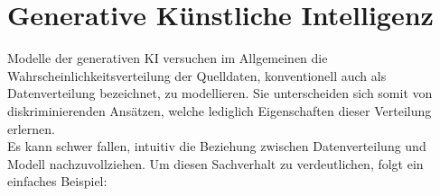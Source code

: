 
\section{Generative Künstliche Intelligenz}

Modelle der generativen \ac{KI} versuchen im Allgemeinen die Wahrscheinlichkeitsverteilung der Quelldaten, konventionell auch als Datenverteilung bezeichnet, zu modellieren. Sie unterscheiden sich somit von diskriminierenden Ansätzen, welche lediglich Eigenschaften dieser Verteilung erlernen. \\
Es kann schwer fallen, intuitiv die Beziehung zwischen Datenverteilung und Modell nachzuvollziehen. Um diesen Sachverhalt zu verdeutlichen, folgt ein einfaches Beispiel:

